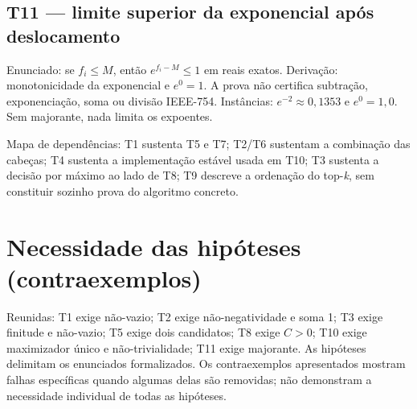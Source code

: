 \subsection{T11 --- limite superior da exponencial após deslocamento}
Enunciado: se $f_i\leq M$, então $e^{f_i-M}\leq1$ em reais exatos. Derivação: monotonicidade da exponencial e $e^0=1$. A prova não certifica subtração, exponenciação, soma ou divisão IEEE-754. Instâncias: $e^{-2}\approx0{,}1353$ e $e^{0}=1{,}0$. Sem majorante, nada limita os expoentes.
\par Mapa de dependências: T1 sustenta T5 e T7; T2/T6 sustentam a combinação das cabeças; T4 sustenta a implementação estável usada em T10; T3 sustenta a decisão por máximo ao lado de T8; T9 descreve a ordenação do top-\textit{k}, sem constituir sozinho prova do algoritmo concreto.
\section{Necessidade das hipóteses (contraexemplos)}
Reunidas: T1 exige não-vazio; T2 exige não-negatividade e soma 1; T3 exige finitude e não-vazio; T5 exige dois candidatos; T8 exige $C>0$; T10 exige maximizador único e não-trivialidade; T11 exige majorante. As hipóteses delimitam os enunciados formalizados. Os contraexemplos apresentados mostram falhas específicas quando algumas delas são removidas; não demonstram a necessidade individual de todas as hipóteses.
